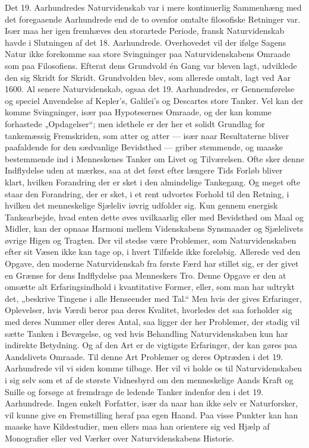 \documentclass[12pt,a4paper,openany]{book}
\newcommand{\opage}[1]{\marginnote{\footnotesize\textit{[#1]}}}
\begin{document}
Det 19. Aarhundredes Naturvidenskab var i mere kontinuerlig
Sammenhæng med det foregaaende Aarhundrede end de to ovenfor
omtalte filosofiske Retninger var. Især maa her igen fremhæves den
storartede Periode, fransk Naturvidenskab havde i Slutningen af det
18. Aarhundrede. Overhovedet vil der ifølge Sagens Natur ikke forekomme
saa store Svingninger paa Naturvidenskabens Omraade som
paa Filosofiens. Efterat dens Grundvold én Gang var bleven lagt, udviklede
den sig Skridt for Skridt. Grundvolden blev, som allerede
omtalt, lagt ved Aar 1600. Al senere Naturvidenskab, ogsaa det 19.
Aarhundredes, er Gennemførelse og speciel Anvendelse af Kepler’s,
\opage{25}Galilei’s og Descartes store Tanker. Vel kan der komme Svingninger,
især paa Hypotesernes Omraade, og der kan komme forhastede „Opdagelser“;
men idethele er der her et solidt Grundlag for tankemæssig
Fremskriden, som atter og atter --- især naar Resultaterne bliver
paafaldende 
for den sædvanlige Bevidsthed --- griber stemmende, og
maaske bestemmende ind i Menneskenes Tanker om Livet og Tilværelsen.
Ofte sker denne Indflydelse uden at mærkes, saa at det
først efter længere Tids Forløb bliver klart, hvilken Forandring der
er sket i den almindelige Tankegang. Og meget ofte staar den Forandring,
der er sket, i et rent udvortes Forhold til den Retning, i
hvilken det menneskelige Sjæleliv iøvrig udfolder sig. Kun gennem
energisk Tankearbejde, hvad enten dette øves uvilkaarlig eller med
Bevidsthed om Maal og Midler, kan der opnaas Harmoni mellem
Videnskabens Synsmaader og Sjælelivets øvrige Higen og Tragten.
Der vil stedse være Problemer, som Naturvidenskaben efter sit Væsen
ikke kan tage op, i hvert Tilfælde ikke foreløbig. Allerede ved
den Opgave, den moderne Naturvidenskab fra første Færd har stillet
sig, er der givet en Grænse for dens Indflydelse paa Menneskers
Tro. Denne Opgave er den at omsætte alt Erfaringsindhold i kvantitative
Former, eller, som man har udtrykt det, „beskrive Tingene
i alle Henseender med Tal.“ Men hvis der gives Erfaringer, Oplevelser,
hvis Værdi beror paa deres Kvalitet, hvorledes det saa forholder
sig med deres Nummer eller deres Antal, saa ligger der her Problemer,
der stadig vil sætte Tanken i Bevægelse, og ved hvis Behandling
Naturvidenskaben kun har indirekte Betydning. Og af den
Art er de vigtigste Erfaringer, der kan gøres paa Aandslivets Omraade.
Til denne Art Problemer og deres Optræden i det 19. Aarhundrede
vil vi siden komme tilbage. Her vil vi holde os til Naturvidenskaben
i sig selv som et af de største Vidnesbyrd om den menneskelige
Aands Kraft og Snille og forsøge at fremdrage de ledende
Tanker indenfor den i det 19. Aarhundrede. Ingen enkelt Forfatter,
især da naar han ikke selv er Naturforsker, vil kunne give en Fremstilling
heraf paa egen Haand. Paa visse Punkter kan han maaske
have Kildestudier, men ellers maa han orientere sig ved Hjælp af
Monografier eller ved Værker over Naturvidenskabens Historie.
\end{document}
